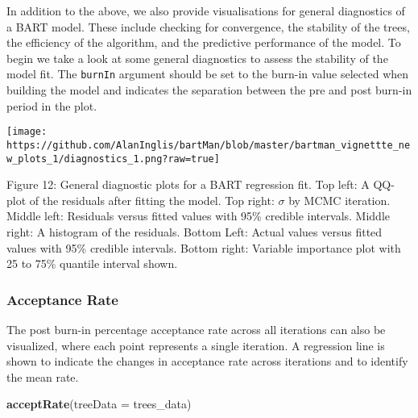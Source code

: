 \documentclass[
]{article}
\newenvironment{Shaded}{\begin{snugshade}}{\end{snugshade}}
\newcommand{\AttributeTok}[1]{\textcolor[rgb]{0.13,0.29,0.53}{#1}}
\newcommand{\DecValTok}[1]{\textcolor[rgb]{0.00,0.00,0.81}{#1}}
\newcommand{\FunctionTok}[1]{\textcolor[rgb]{0.13,0.29,0.53}{\textbf{#1}}}
\newcommand{\NormalTok}[1]{#1}
\newcommand{\SpecialCharTok}[1]{\textcolor[rgb]{0.81,0.36,0.00}{\textbf{#1}}}
\begin{document}
In addition to the above, we also provide visualisations for general
diagnostics of a BART model. These include checking for convergence, the
stability of the trees, the efficiency of the algorithm, and the
predictive performance of the model. To begin we take a look at some
general diagnostics to assess the stability of the model fit. The
\texttt{burnIn} argument should be set to the burn-in value selected
when building the model and indicates the separation between the pre and
post burn-in period in the plot.

\begin{Shaded}
\end{Shaded}

\begin{center}\texttt{[image: https://github.com/AlanInglis/bartMan/blob/master/bartman\_vignettte\_new\_plots\_1/diagnostics\_1.png?raw=true]} \end{center}

\protect\hypertarget{fig12:fig12}{}{Figure 12: }General diagnostic plots
for a BART regression fit. Top left: A QQ-plot of the residuals after
fitting the model. Top right: \(\sigma\) by MCMC iteration. Middle left:
Residuals versus fitted values with 95\% credible intervals. Middle
right: A histogram of the residuals. Bottom Left: Actual values versus
fitted values with 95\% credible intervals. Bottom right: Variable
importance plot with 25 to 75\% quantile interval shown.

\hypertarget{acceptance-rate}{%
\subsubsection{Acceptance Rate}\label{acceptance-rate}}

The post burn-in percentage acceptance rate across all iterations can
also be visualized, where each point represents a single iteration. A
regression line is shown to indicate the changes in acceptance rate
across iterations and to identify the mean rate.

\begin{Shaded}
\begin{Highlighting}[]
\FunctionTok{acceptRate}\NormalTok{(}\AttributeTok{treeData =}\NormalTok{ trees\_data)}
\end{Highlighting}
\end{Shaded}
\end{document}
